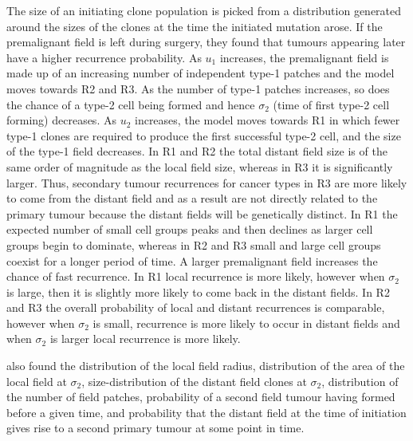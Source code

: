 \documentclass[\main/thesis.tex]{subfiles}
\begin{document}
The size of an initiating clone population is picked from a distribution generated around the sizes of the clones at the time the initiated mutation arose. If the premalignant field is left during surgery, they found that tumours appearing later have a higher recurrence probability. As $u_1$ increases, the premalignant field is made up of an increasing number of independent type-1 patches and the model moves towards R2 and R3. As the number of type-1 patches increases, so does the chance of a type-2 cell being formed and hence $\sigma_2$ (time of first type-2 cell forming) decreases. As $u_2$ increases, the model moves towards R1 in which fewer type-1 clones are required to produce the first successful type-2 cell, and the size of the type-1 field decreases. In R1 and R2 the total distant field size is of the same order of magnitude as the local field size, whereas in R3 it is significantly larger. Thus, secondary tumour recurrences for cancer types in R3 are more likely to come from the distant field and as a result are not directly related to the primary tumour because the distant fields will be genetically distinct. In R1 the expected number of small cell groups peaks and then declines as larger cell groups begin to dominate, whereas in R2 and R3 small and large cell groups coexist for a longer period of time. A larger premalignant field increases the chance of fast recurrence. In R1 local recurrence is more likely, however when $\sigma_2$ is large, then it is slightly more likely to come back in the distant fields. In R2 and R3 the overall probability of local and distant recurrences is comparable, however when $\sigma_2$ is small, recurrence is more likely to occur in distant fields and when $\sigma_2$ is larger local recurrence is more likely. 

\textcite{Foo} also found the distribution of the local field radius, distribution of the area of the local field at $\sigma_2$, size-distribution of the distant field clones at $\sigma_2$, distribution of the number of field patches, probability of a second field tumour having formed before a given time, and probability that the distant field at the time of initiation gives rise to a second primary tumour at some point in time. 
\end{document}
